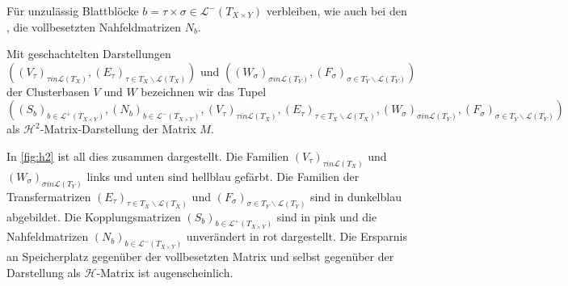       Für unzulässig Blattblöcke $b = \tau \times \sigma \in \mathcal{L}^-\left(T_{X \times Y}\right)$ verbleiben, wie auch bei den \hmat, die vollbesetzten Nahfeldmatrizen $N_b$.
      
      Mit geschachtelten Darstellungen 
      \[
      \left( 
	\left(V_\tau \right)_{\tau in \mathcal{L}\left(T_X\right)} , \left(E_\tau\right)_{\tau \in T_X \backslash \mathcal{L}\left(T_X\right)} \right) \text{ und }
	\left( \left(W_\sigma\right)_{\sigma in \mathcal{L}\left(T_Y\right)} , \left(F_\sigma\right)_{\sigma \in T_Y \backslash \mathcal{L}\left(T_Y\right)}
      \right) 
      \]
      der Clusterbasen $V$ und $W$ bezeichnen wir das Tupel
      \[
       \left(
	\left(S_b\right)_{b \in \mathcal{L}^+\left(T_{X \times Y}\right)} , \left(N_b\right)_{b \in \mathcal{L}^-\left(T_{X \times Y}\right)},
	\left(V_\tau\right)_{\tau in \mathcal{L}\left(T_X\right)} , \left(E_\tau\right)_{\tau \in T_X \backslash \mathcal{L}\left(T_X\right)},
	\left(W_\sigma\right)_{\sigma in \mathcal{L}\left(T_Y\right)} , \left(F_\sigma\right)_{\sigma \in T_Y \backslash \mathcal{L}\left(T_Y\right)}
       \right)
      \]
      als $\mathcal{H}^2$-Matrix-Darstellung der Matrix $M$.
      
      In \autoref{fig:h2} ist all dies zusammen dargestellt. Die Familien $\left(V_\tau\right)_{\tau in \mathcal{L}\left(T_X\right)}$ und $\left(W_\sigma\right)_{\sigma in \mathcal{L}\left(T_Y\right)}$
      links und unten sind hellblau gefärbt. Die Familien der Transfermatrizen $\left(E_\tau\right)_{\tau \in T_X \backslash \mathcal{L}\left(T_X\right)}$ und 
      $\left(F_\sigma\right)_{\sigma \in T_Y \backslash \mathcal{L}\left(T_Y\right)}$ sind in dunkelblau abgebildet. Die Kopplungsmatrizen $\left(S_b\right)_{b \in \mathcal{L}^+\left(T_{X \times Y}\right)}$
      sind in pink und die Nahfeldmatrizen $\left(N_b\right)_{b \in \mathcal{L}^-\left(T_{X \times Y}\right)}$ unverändert in rot dargestellt. Die Ersparnis an Speicherplatz gegenüber der vollbesetzten
      Matrix und selbst gegenüber der Darstellung als $\mathcal{H}$-Matrix ist augenscheinlich.

